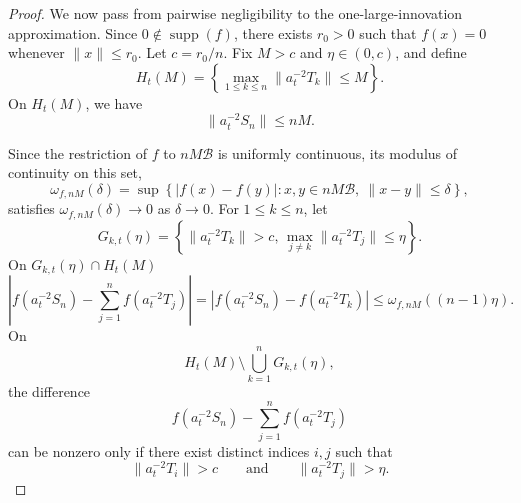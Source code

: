 \documentclass[preprint,12pt]{elsarticle}
\theoremstyle{definition}
\theoremstyle{remark}
\newcommand{\xbf}{{ x}}
\newcommand{\ybf}{{ y}}
\newcommand{\Tbf}{{ T}}
\newcommand{\1}{{\mathbf 1}}
\numberwithin{equation}{section}
\newcommand{\Bcal}{\mathcal{B}}
\begin{document}
\begin{proof}
    We now pass from pairwise negligibility to the one-large-innovation
    approximation. 
    Since $0\notin\operatorname{supp}(f)$, there exists $r_0>0$ such that $f(\xbf)=0$ whenever $\|\xbf\|\leq r_0$.
    Let $c=r_0/n$.
    Fix $M>c$ and $\eta\in(0,c)$, and define
    \begin{equation*}
      H_t(M)
      =
      \left\{
        \max_{1\leq k\leq n}\|a_t^{-2}\Tbf_{k}\|\leq M
      \right\}.
    \end{equation*}
    On $H_t(M)$, we have
    \begin{equation*}
      \|a_t^{-2}S_n\|\leq nM.
    \end{equation*}

    Since the restriction of $f$ to $nM\Bcal$ is uniformly continuous,
    its modulus of continuity on this set,
    \begin{equation*}
      \omega_{f,nM}(\delta)
      =
      \sup\left\{
        |f(\xbf)-f(\ybf)|:
        \xbf,\ybf\in nM\Bcal,\ 
        \|\xbf-\ybf\|\leq\delta
      \right\},
    \end{equation*}
    satisfies $\omega_{f,nM}(\delta)\to 0$ as $\delta\to 0$.
    For $1\leq k\leq n$, let
    \begin{equation*}
      G_{k,t}(\eta)
      =
      \left\{
        \|a_t^{-2}\Tbf_{k}\|>c,\,
        \max_{j\neq k}\|a_t^{-2}\Tbf_{j}\|\leq\eta
      \right\}.
    \end{equation*}
    On $G_{k,t}(\eta)\cap H_t(M)$
    \begin{equation*}
      \left|
        f(a_t^{-2}S_n)-\sum_{j=1}^nf(a_t^{-2}\Tbf_{j})
      \right| 
      = \left|
        f(a_t^{-2}S_n)-f(a_t^{-2}\Tbf_{k})
      \right| 
      \leq\omega_{f,nM}((n-1)\eta).
    \end{equation*}
    On
    \begin{equation*}
      H_t(M)\setminus\bigcup_{k=1}^nG_{k,t}(\eta),
    \end{equation*}
    the difference
    \begin{equation*}
       f(a_t^{-2}S_n)-\sum_{j=1}^nf(a_t^{-2}\Tbf_{j})   \end{equation*}
    can be nonzero only if there exist distinct indices $i,j$ such that
    \begin{equation*}
      \|a_t^{-2}\Tbf_{i}\|>c
      \qquad\text{and}\qquad
      \|a_t^{-2}\Tbf_{j}\|>\eta.
    \end{equation*}


\end{proof}
\end{document}

